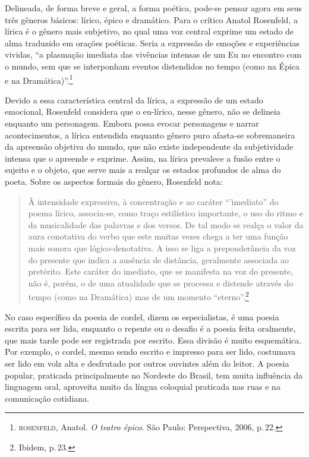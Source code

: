 \documentclass[11pt]{extarticle}
\begin{document}
Delineada, de forma breve e geral, a forma poética, pode-se pensar agora em seus três gêneros básicos: lírico, épico e dramático.
Para o crítico Anatol Rosenfeld, a lírica é o gênero mais subjetivo, no qual uma voz central exprime um estado de alma traduzido em orações poéticas.
Seria a expressão de emoções e experiências vividas, ``a plasmação imediata das vivências intensas de um Eu no encontro com o mundo, sem que se interponham eventos distendidos no tempo (como na Épica e na Dramática)''.\footnote{\textsc{rosenfeld}, Anatol. \textit{O teatro épico}. São Paulo: Perspectiva, 2006, p.\,22.}

Devido a essa característica central da lírica, a expressão de um estado emocional, Rosenfeld considera que o eu-lírico, nesse gênero, não se delineia enquanto um personagem. Embora possa evocar personagens e narrar acontecimentos, a lírica entendida enquanto gênero puro afasta-se sobremaneira da apreensão objetiva do mundo, que não existe independente da subjetividade intensa que o apreende e exprime. Assim, na lírica prevalece a fusão entre o sujeito e o objeto, que serve mais a realçar os estados profundos de alma do poeta.
Sobre os aspectos formais do gênero, Rosenfeld nota:

\begin{quote}
À intensidade expressiva, à concentração e ao caráter ``'imediato'' do poema lírico, associa-se, como traço estilístico importante, o uso do ritmo e da musicalidade das palavras e dos versos. De tal modo se realça o valor da aura conotativa do verbo que este muitas vezes chega a ter uma função mais sonora que lógico-denotativa. A isso se liga a preponderância da voz do presente que indica a ausência de distância, geralmente associada ao pretérito. Este caráter do imediato, que se manifesta na voz do presente, não é, porém, o de uma atualidade que se processa e distende através do tempo (como na Dramática) mas de um momento ``eterno''.\footnote{Ibidem, p.\,23.}
\end{quote}

No caso específico da poesia de cordel, dizem os especialistas, é uma poesia escrita para
ser lida, enquanto o repente ou o desafio é a poesia feita oralmente, que mais tarde pode
ser registrada por escrito. Essa divisão é muito esquemática. Por exemplo, o
cordel, mesmo sendo escrito e impresso para ser lido, costumava ser lido em
volz alta e desfrutado por outros ouvintes além do leitor. A poesia popular,
praticada principalmente no Nordeste do Brasil, tem muita influência da
linguagem oral, aproveita muito da língua coloquial praticada nas ruas e na
comunicação cotidiana. 
\end{document}
